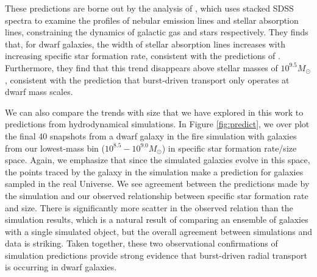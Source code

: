 \documentclass[iop]{emulateapj}
\begin{document}
These predictions are borne out by the analysis of \cite{Cicone16}, which uses stacked SDSS spectra to examine the profiles of nebular emission lines and stellar absorption lines, constraining the dynamics of galactic gas and stars respectively. They finds that, for dwarf galaxies, the width of stellar absorption lines increases with increasing specific star formation rate, consistent with the predictions of \cite{El-Badry17}. Furthermore, they find that this trend disappears above stellar masses of $10^{9.5} M_{\odot}$, consistent with the prediction that burst-driven transport only operates at dwarf mass scales.

We can also compare the trends with size that we have explored in this work to predictions from hydrodynamical simulations. In Figure \ref{fig:predict}, we over plot the final 40 snapshots from a dwarf galaxy in the fire simulation with galaxies from our lowest-mass bin ($10^{8.5}-10^{9.0} M_{\odot}$) in specific star formation rate/size space. Again, we emphasize that since the simulated galaxies evolve in this space, the points traced by the galaxy in the simulation make a prediction for galaxies sampled in the real Universe. We see agreement between the predictions made by the simulation and our observed relationship between specific star formation rate and size. There is significantly more scatter in the observed relation than the simulation results, which is a natural result of comparing an ensemble of galaxies with a single simulated object, but the overall agreement between simulations and data is striking. Taken together, these two observational confirmations of simulation predictions provide strong evidence that burst-driven radial transport is occurring in dwarf galaxies.
\end{document}
